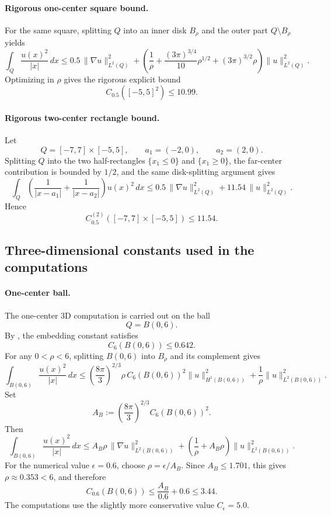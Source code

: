 \documentclass[11pt]{article}
\theoremstyle{plain}
\theoremstyle{definition}
\theoremstyle{remark}
\begin{document}
\paragraph{Rigorous one-center square bound.}
For the same square, splitting $Q$ into an inner disk $B_\rho$ and the outer
part $Q\setminus B_\rho$ yields
\[
\int_Q \frac{u(x)^2}{|x|}\,dx
\le
0.5\,\|\nabla u\|_{L^2(Q)}^2
+
\left(
\frac{1}{\rho}
+
\frac{(3\pi)^{3/4}}{10}\rho^{1/2}
+
(3\pi)^{3/2}\rho
\right)\|u\|_{L^2(Q)}^2.
\]
Optimizing in $\rho$ gives the rigorous explicit bound
\[
C_{0.5}([-5,5]^2)\le 10.99.
\]

\paragraph{Rigorous two-center rectangle bound.}
Let
\[
Q=[-7,7]\times[-5,5],
\qquad
a_1=(-2,0),
\qquad
a_2=(2,0).
\]
Splitting $Q$ into the two half-rectangles $\{x_1\le 0\}$ and $\{x_1\ge 0\}$,
the far-center contribution is bounded by $1/2$, and the same disk-splitting
argument gives
\[
\int_Q \left(\frac{1}{|x-a_1|}+\frac{1}{|x-a_2|}\right)u(x)^2\,dx
\le
0.5\,\|\nabla u\|_{L^2(Q)}^2
+
11.54\,\|u\|_{L^2(Q)}^2.
\]
Hence
\[
C_{0.5}^{(2)}([-7,7]\times[-5,5])\le 11.54.
\]

\subsection{Three-dimensional constants used in the computations}

\paragraph{One-center ball.}
The one-center 3D computation is carried out on the ball
\[
Q=B(0,6).
\]
By , the embedding constant satisfies
\[
  C_6(B(0,6))\le 0.642.
\]
For any \(0<\rho<6\), splitting \(B(0,6)\) into \(B_\rho\) and its complement gives
\[
\int_{B(0,6)}\frac{u(x)^2}{|x|}\,dx
\le
\left(\frac{8\pi}{3}\right)^{2/3}\rho\,C_6(B(0,6))^2
\|u\|_{H^1(B(0,6))}^2
+
\frac1\rho\|u\|_{L^2(B(0,6))}^2 .
\]
Set
\[
  A_B:=\left(\frac{8\pi}{3}\right)^{2/3} C_6(B(0,6))^2 .
\]
Then
\[
\int_{B(0,6)}\frac{u(x)^2}{|x|}\,dx
\le
A_B\rho\,\|\nabla u\|_{L^2(B(0,6))}^2
+
\left(\frac1\rho+A_B\rho\right)\|u\|_{L^2(B(0,6))}^2 .
\]
For the numerical value \(\epsilon=0.6\), choose \(\rho=\epsilon/A_B\).
Since \(A_B\le 1.701\), this gives \(\rho\approx0.353<6\), and therefore
\begin{equation}
\label{eq:ceps-ball-3d}
  C_{0.6}(B(0,6))
  \le
  \frac{A_B}{0.6}+0.6
  \le 3.44 .
\end{equation}
The computations use the slightly more conservative value \(C_\epsilon=5.0\).
\end{document}
